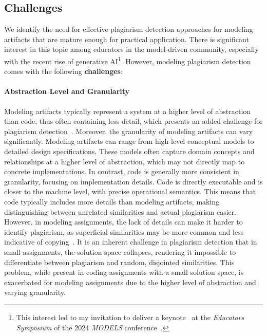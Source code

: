 \subsection{Challenges}\label{sec:mde-challenges}
We identify the need for effective plagiarism detection approaches for modeling artifacts that are mature enough for practical application. There is significant interest in this topic among educators in the model-driven community, especially with the recent rise of generative AI\footnote{This interest led to my invitation to deliver a keynote~\cite{Saglam2024Keynote} at the \textit{Educators Symposium} of the 2024 \textit{MODELS} conference~\cite{models2024_preface}.}.
However, modeling plagiarism detection comes with the following \textbf{challenges}:
\paragraph{Abstraction Level and Granularity}
Modeling artifacts typically represent a system at a higher level of abstraction than code, thus often containing less detail, which presents an added challenge for plagiarism detection~\cite{Saglam2022}.
Moreover, the granularity of modeling artifacts can vary significantly. Modeling artifacts can range from high-level conceptual models to detailed design specifications. These models often capture domain concepts and relationships at a higher level of abstraction, which may not directly map to concrete implementations. In contrast, code is generally more consistent in granularity, focusing on implementation details. Code is directly executable and is closer to the machine level, with precise operational semantics. This means that code typically includes more details than modeling artifacts, making distinguishing between unrelated similarities and actual plagiarism easier. However, in modeling assignments, the lack of details can make it harder to identify plagiarism, as superficial similarities may be more common and less indicative of copying~\cite{Saglam2024a}.
It is an inherent challenge in plagiarism detection that in small assignments, the solution space collapses, rendering it impossible to differentiate between plagiarism and random, disjointed similarities.
This problem, while present in coding assignments with a small solution space, is exacerbated for modeling assignments due to the higher level of abstraction and varying granularity.

